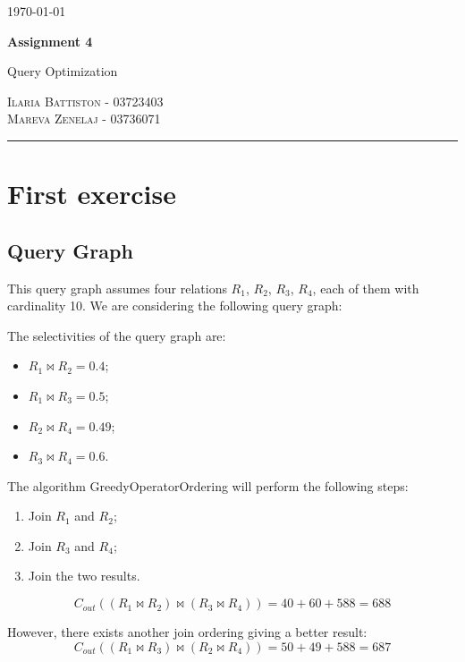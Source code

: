 \documentclass[12pt]{article}
\begin{document}
	
\begin{flushright}
	\today
\end{flushright}
{\Large \textbf{Assignment 4}}
	
{\large Query Optimization}
	
\textsc{Ilaria Battiston - 03723403} \\
\textsc{Mareva Zenelaj - 03736071}
	
\rule{\linewidth}{0.5pt}

\section{First exercise}
\subsection{Query Graph}
This query graph assumes four relations $R_1$, $R_2$, $R_3$, $R_4$, each of them with cardinality 10. We are considering the following query graph:


The selectivities of the query graph are:
\begin{itemize}
	\item $R_1 \bowtie R_2 = 0.4$;
	\item $R_1 \bowtie R_3 = 0.5$;
	\item $R_2 \bowtie R_4 = 0.49$;
	\item $R_3 \bowtie R_4 = 0.6$.
\end{itemize}

The algorithm GreedyOperatorOrdering will perform the following steps:
\begin{enumerate}
	\item Join $R_1$ and $R_2$;
	\item Join $R_3$ and $R_4$;
	\item Join the two results.
\end{enumerate}
$$ C_{out}((R_1 \bowtie R_2) \bowtie (R_3 \bowtie R_4)) = 40 + 60 + 588 = 688$$

However, there exists another join ordering giving a better result:
$$ C_{out}((R_1 \bowtie R_3) \bowtie (R_2 \bowtie R_4)) = 50 + 49 + 588 = 687$$
\end{document}
